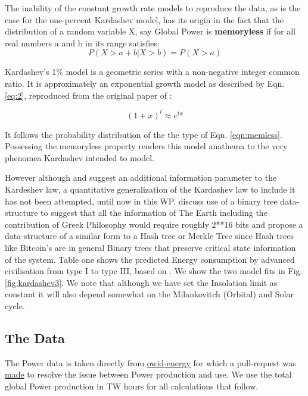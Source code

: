 \documentclass[final,5p,times,twocolumn,authoryear]{elsarticle}
\begin{document}
The inability of the constant growth rate models to reproduce the data, as is the case for the one-percent Kardashev model, has its origin in the fact that the distribution of a random variable X, say Global Power is \textbf{memoryless} if for all real numbers a and b in its range satisfies:
\begin{equation}
P(X>a +b|X>b)=P(X>a)
\label{eqn:memless}
\end{equation}

Kardashev's 1\% model is a geometric series with a non-negative integer common ratio. It is approximately an exponential growth model as described by Eqn. \ref{eq:2}, reproduced from the original paper of \cite{kar64}:

\begin{equation}
(1+x)^t \approx e^{tx}
\label{eq:2}
\end{equation}

It follows the probability distribution of the the type of Eqn. \ref{eqn:memless}. Possessing the memoryless property renders this model anathema to the very phenomea Kardashev intended to model.

 However although \cite{sagan73} and \cite{kar64} suggest an additional information parameter to the Kardeshev law, a quantitative generalization of the Kardashev law to include it has not been attempted, until now in this WP.  \cite{sagan73} discuss use of a binary tree data-structure to suggest that all the information of The Earth including the contribution of Greek Philosophy would require roughly 2**16 bits and propose a data-structure of a similar form to a Hash tree or Merkle Tree since Hash trees like Bitcoin's are in general Binary trees that preserve critical state information of the system. Table one shows the predicted Energy consumption by advanced civilisation from type I to type III, based on \cite{kar64}. We show the two model fits in Fig. \ref{fig:kardashev3}. We note that although we have set the Insolation limit as constant it will also depend somewhat on the Milankovitch (Orbital) and Solar cycle. 

\subsection{The Data}
\label{subsec: data}

The Power data is taken directly from \href{https://github.com/owid/energy-data}{owid-energy} for which a pull-request was \href{https://github.com/owid/energy-data/pull/23}{made} to resolve the issue between Power production and use. We use the total global Power production in TW hours for all calculations that follow.
\end{document}
